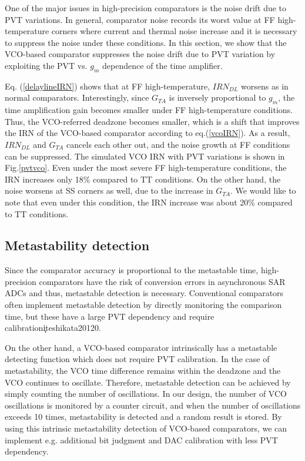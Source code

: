 \documentclass[journal]{IEEEtran}
\begin{document}
One of the major issues in high-precision comparators is the noise drift due to PVT variations. In general, comparator noise records its worst value at  FF high-temperature corners where current and thermal noise increase and it is necessary to suppress the noise under these conditions. In this section, we show that the VCO-based comparator suppresses the noise drift due to PVT variation by exploiting the PVT vs. $g_m$ dependence of the time amplifier.

Eq. (\ref{delaylineIRN}) shows that at FF high-temperature, $IRN_{DL}$ worsens as in normal comparators.
Interestingly, since $G_{TA}$ is inversely proportional to $g_m$, the time amplification gain becomes smaller under FF high-temperature conditions. Thus, the VCO-referred deadzone becomes smaller, which is a shift that improves the IRN of the VCO-based comparator according to eq.(\ref{vcoIRN}). As a result, $IRN_{DL}$ and $G_{TA}$ cancels each other out, and the noise growth at FF conditions can be suppressed. The simulated VCO IRN with PVT variations is shown in Fig.\ref{pvtvco}. Even under the most severe FF high-temperature conditions, the IRN increases only 18\% compared to TT conditions. On the other hand, the noise worsens at SS corners as well, due to the increase in $G_{TA}$. We would like to note that even under this condition, the IRN increase was about 20\% compared to TT conditions.

\subsection{Metastability detection}
Since the comparator accuracy is proportional to the metastable time, high-precision comparators have the risk of conversion errors in asynchronous SAR ADCs and thus, metastable detection is necessary.
Conventional comparators often implement metastable detection by directly monitoring the comparison time, but these have a large PVT dependency and require calibration\c
ite{shikata20120}.

On the other hand, a VCO-based comparator intrinsically has a metastable detecting function which does not require PVT calibration. In the case of metastability, the VCO time difference remains within the deadzone and the VCO continues to oscillate. Therefore, metastable detection can be achieved by simply counting the number of oscillations. In our design, the number of VCO oscillations is monitored by a counter circuit, and when the number of oscillations exceeds 10 times, metastability is detected and a random result is stored. By using this intrinsic metastability detection of VCO-based comparators, we can implement e.g. additional bit judgment \cite{shikata20120,ding20190} and DAC calibration \cite{zhu201914} with less PVT dependency.
\end{document}
